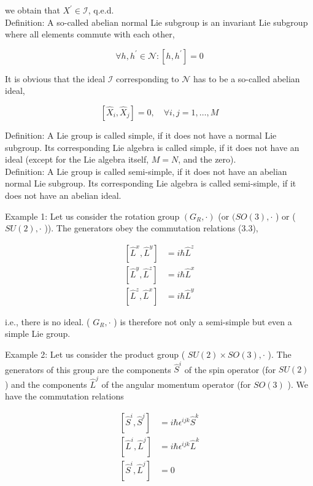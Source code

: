 \documentclass[10pt, letterpaper]{article}
\begin{document}
we obtain that $X^{\prime} \in \mathcal{I}$, q.e.d.\\
Definition: A so-called abelian normal Lie subgroup is an invariant Lie subgroup where all elements commute with each other,

$$
\forall h, h^{\prime} \in \mathcal{N}:\left[h, h^{\prime}\right]=0
$$

It is obvious that the ideal $\mathcal{I}$ corresponding to $\mathcal{N}$ has to be a so-called abelian ideal,

$$
\left[\hat{X}_{i}, \hat{X}_{j}\right]=0, \quad \forall i, j=1, \ldots, M
$$

Definition: A Lie group is called simple, if it does not have a normal Lie subgroup. Its corresponding Lie algebra is called simple, if it does not have an ideal (except for the Lie algebra itself, $M=N$, and the zero).\\
Definition: A Lie group is called semi-simple, if it does not have an abelian normal Lie subgroup. Its corresponding Lie algebra is called semi-simple, if it does not have an abelian ideal.

Example 1: Let us consider the rotation group $\left(G_{R}, \cdot\right)$ (or $(S O(3), \cdot$ ) or ( $S U(2), \cdot$ )). The generators obey the commutation relations (3.3),

$$
\begin{aligned}
{\left[\hat{L}^{x}, \hat{L}^{y}\right] } & =i \hbar \hat{L}^{z} \\
{\left[\hat{L}^{y}, \hat{L}^{z}\right] } & =i \hbar \hat{L}^{x} \\
{\left[\hat{L}^{z}, \hat{L}^{x}\right] } & =i \hbar \hat{L}^{y}
\end{aligned}
$$

i.e., there is no ideal. ( $G_{R}, \cdot$ ) is therefore not only a semi-simple but even a simple Lie group.

Example 2: Let us consider the product group ( $S U(2) \times S O(3), \cdot$ ). The generators of this group are the components $\hat{S}^{i}$ of the spin operator (for $S U(2)$ ) and the components $\hat{L}^{j}$ of the angular momentum operator (for $S O(3)$ ). We have the commutation relations

$$
\begin{aligned}
{\left[\hat{S}^{i}, \hat{S}^{j}\right] } & =i \hbar \epsilon^{i j k} \hat{S}^{k} \\
{\left[\hat{L}^{i}, \hat{L}^{j}\right] } & =i \hbar \epsilon^{i j k} \hat{L}^{k} \\
{\left[\hat{S}^{i}, \hat{L}^{j}\right] } & =0
\end{aligned}
$$
\end{document}
